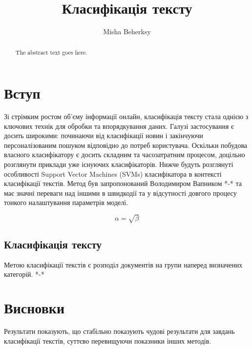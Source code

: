 \documentclass{article}
\begin{document}
\title{Класифікація тексту}
\author{Misha Beherksy}

\maketitle

\begin{abstract}
The abstract text goes here.
\end{abstract}

\section{Вступ}
Зі стрімким ростом об'єму інформації онлайн, класифікація тексту стала однією з ключових
технік для обробки та впорядкування даних. Галузі застосування є досить широкими: 
починаючи від класифікації новин і закінчуючи персоналізованим пошуком відповідно до
потреб користувача. Оскільки побудова власного класифікатору є досить складним та
часозатратним процесом, доцільно розглянути приклади уже існуючих класифікаторів.
Нижче будуть розглянуті особливості  Support Vector Machines (SVMs) класифікатора в контексті класифікації текстів. Метод був запропонований Володимиром Вапником *-* та 
має значні переваги над іншими в швидкодії та у відсутності довгого процесу тонкого 
налаштування параметрів моделі.

\begin{equation}
    \label{simple_equation}
    \alpha = \sqrt{ \beta }
\end{equation}

\subsection{Класифікація тексту}
Метою класифікації текстів є розподіл документів на групи наперед визначених категорій. *-*


\section{Висновки}
Результати показують, що стабільно показують чудові результати для завдань класифікації
текстів, суттєво перевищуючи показники інших методів.
\end{document}
